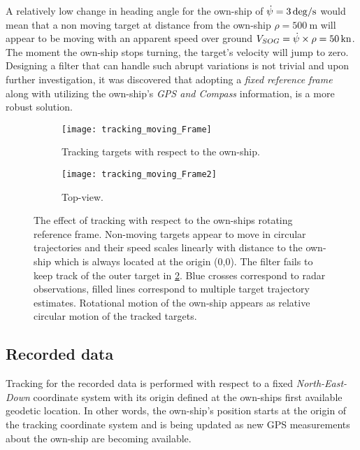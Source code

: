 A relatively low change in heading angle for the own-ship of $\dot{{\psi}}=\SI{3}{\deg\per\second}$ would mean that a non moving target at distance from the own-ship $\rho = \SI{500}{\meter}$ will appear to be moving with an apparent speed over ground $\boatspeed_{SOG} = \dot{\heading}\times \rho = \SI{50}{\knot}$. The moment the own-ship stops turning, the target's velocity will jump to zero. Designing a filter that can handle such abrupt variations is not trivial and upon further investigation, it was discovered that adopting a \emph{fixed reference frame} along with utilizing the own-ship's \emph{GPS and Compass} information, is a more robust solution.


\begin{figure}[H]
	\centering
	\begin{subfigure}[b]{.9\textwidth}
		\centering
		\texttt{[image: tracking\_moving\_Frame]}
		\caption{Tracking targets with respect to the own-ship.}
		\label{fig:movingFrame1}
	\end{subfigure}\hfill
	\begin{subfigure}[b]{.9\textwidth}
		\centering
		\texttt{[image: tracking\_moving\_Frame2]}
		\caption{Top-view.}
		\label{fig:movingFrame2}
	\end{subfigure}
	\caption{The effect of tracking with respect to the own-ships rotating reference frame. Non-moving targets appear to move in circular trajectories and their speed scales linearly with distance to the own-ship which is always located at the origin (0,0). The filter fails to keep track of the outer target in \cref{fig:movingFrame2}. Blue crosses correspond to radar observations, filled lines correspond to multiple target trajectory estimates. Rotational motion of the own-ship appears as relative circular motion of the tracked targets.}
	\label{fig:movingFrame}
\end{figure}



\subsection{Recorded data}
Tracking for the recorded data is performed with respect to a fixed \emph{North-East-Down} coordinate system with its origin defined at the own-ships first available geodetic location. In other words, the own-ship's position starts at the origin of the tracking coordinate system and is being updated as new GPS  measurements about the own-ship are becoming available.

